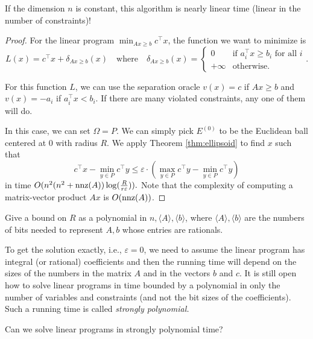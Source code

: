 \begin{rem}
If the dimension $n$ is constant, this algorithm is nearly linear
time (linear in the number of constraints)!
\end{rem}

\begin{proof}
For the linear program $\min_{Ax\geq b}c^{\top}x$, the function we
want to minimize is
\begin{equation}
L(x)=c^{\top}x+\delta_{Ax\geq b}(x)\quad\text{where}\quad\delta_{Ax\geq b}(x)=\begin{cases}
0 & \text{if }a^{\top}_{i}x\geq b_{i}\text{ for all }i\\
+\infty & \text{otherwise.}
\end{cases}.\label{eq:LP_func}
\end{equation}

For this function $L$, we can use the separation oracle $v(x)=c$
if $Ax\geq b$ and $v(x)=-a_{i}$ if $a^{\top}_{i}x<b_{i}$. If there
are many violated constraints, any one of them will do.

In this case, we can set $\Omega=P$. We can simply pick $E^{(0)}$
to be the Euclidean ball centered at $0$ with radius $R$. We apply
Theorem \ref{thm:ellipsoid} to find $x$ such that
\[
c^{\top}x-\min_{y\in P}c^{\top}y\leq\varepsilon\cdot(\max_{y\in P}c^{\top}y-\min_{y\in P}c^{\top}y)
\]
in time $O(n^{2}(n^{2}+\mathrm{nnz}(A))\log(\frac{R}{r\varepsilon})).$ Note
that the complexity of computing a matrix-vector product $Ax$ is
$O(\mathrm{nnz}(A))$. 
\end{proof}
\begin{xca}
Give a bound on $R$ as a polynomial in $n,\langle A\rangle,\langle b\rangle$,
where $\langle A\rangle,\langle b\rangle$ are the numbers of bits
needed to represent $A,b$ whose entries are rationals.
\end{xca}

To get the solution exactly, i.e., $\varepsilon=0$, we need to assume
the linear program has integral (or rational) coefficients and then
the running time will depend on the sizes of the numbers in the matrix
$A$ and in the vectors $b$ and $c$. It is still open how to solve
linear programs in time bounded by a polynomial in only the number
of variables and constraints (and not the bit sizes of the coefficients).
Such a running time is called \emph{strongly polynomial. }
\begin{problem*}
Can we solve linear programs in strongly polynomial time?
\end{problem*}

